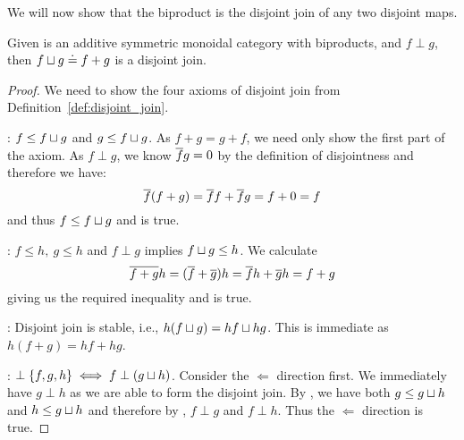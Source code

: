 We will now show that the biproduct is the disjoint join of any two disjoint maps.

\begin{lemma}\label{lem:biproduct_is_the_disjoint_join_in_cfrobx}
  Given \X is an  additive symmetric monoidal category with
biproducts, and $f\perp g$, then $f\sqcup g \doteq f+g$ is a disjoint join.
\end{lemma}
\begin{proof}
  We need to show the four axioms of disjoint join from Definition~\ref{def:disjoint_join}.

   : $f \le f \sqcup g$ and $g \le f \sqcup g$.
  As $f+g = g+f$, we need only show the first part of the axiom. As $f\perp g$, we know $\overline{f}g=0$
  by the definition of disjointness and therefore we have:
  \[
    \overline{f}(f+g) = \overline{f}f + \overline{f} g = f + 0 = f
  \]
  and thus $f \le f \sqcup g$ and  is true.

  : $f \le h,\ g \le h$ and $f\perp g$ implies $f \sqcup g \le h$.  We calculate
  \[
    \overline{f+g}h = (\overline{f}+\overline{g}) h = \overline{f}h + \overline{g} h = f + g
  \]
  giving us the required inequality and  is true.

  : Disjoint join is stable, i.e., $h(f \sqcup g) = h f \sqcup h g$. This is immediate
  as $h(f+g) = hf + hg$.

  : $\perp \{f, g, h\} \iff f \perp (g\sqcup h)$. Consider the $\Longleftarrow$
  direction first. We immediately have $g\perp h$ as we are able to form the disjoint join. By
  , we have both $g \le g \sqcup h$ and $h \le g\sqcup h$ and therefore by
  , $f \perp g$ and $f\perp h$. Thus the $\Longleftarrow$ direction is true.


\end{proof}
